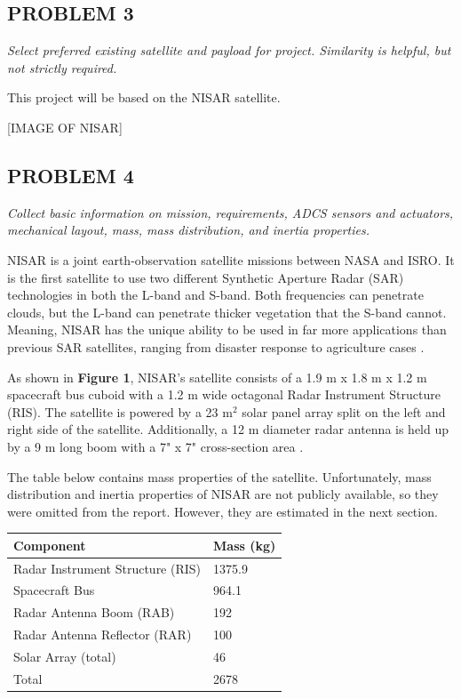 \subsection{PROBLEM 3}
\textit{Select preferred existing satellite and payload for project. Similarity is helpful, but not strictly required.}

This project will be based on the NISAR satellite.

[IMAGE OF NISAR]

\subsection{PROBLEM 4}
\textit{Collect basic information on mission, requirements, ADCS sensors and actuators, mechanical layout, mass, mass distribution, and inertia properties.}

NISAR is a joint earth-observation satellite missions between NASA and ISRO. It is the first satellite to use two different Synthetic Aperture Radar (SAR) technologies in both the L-band and S-band. Both frequencies can penetrate clouds, but the L-band can penetrate thicker vegetation that the S-band cannot. Meaning, NISAR has the unique ability to be used in far more applications than previous SAR satellites, ranging from disaster response to agriculture cases \cite{NisarApps}.

As shown in \textbf{Figure 1}, NISAR's satellite consists of a 1.9 m x 1.8 m x 1.2 m spacecraft bus cuboid with a 1.2 m wide octagonal Radar Instrument Structure (RIS). The satellite is powered by a 23 m$^2$ solar panel array split on the left and right side of the satellite. Additionally, a 12 m diameter radar antenna is held up by a 9 m long boom with a 7" x 7" cross-section area \cite{NisarMission}.

The table below contains mass properties of the satellite. Unfortunately, mass distribution and inertia properties of NISAR are not publicly available, so they were omitted from the report. However, they are estimated in the next section.

\begin{table}[]
\begin{tabular}{|l|l|}
\hline
\textbf{Component}               & \textbf{Mass (kg)} \\ \hline
Radar Instrument Structure (RIS) & 1375.9             \\ \hline
Spacecraft Bus                   & 964.1              \\ \hline
Radar Antenna Boom (RAB)         & 192                \\ \hline
Radar Antenna Reflector (RAR)    & 100                \\ \hline
Solar Array (total)              & 46                 \\ \hline
Total                            & 2678               \\ \hline
\end{tabular}
\end{table}

